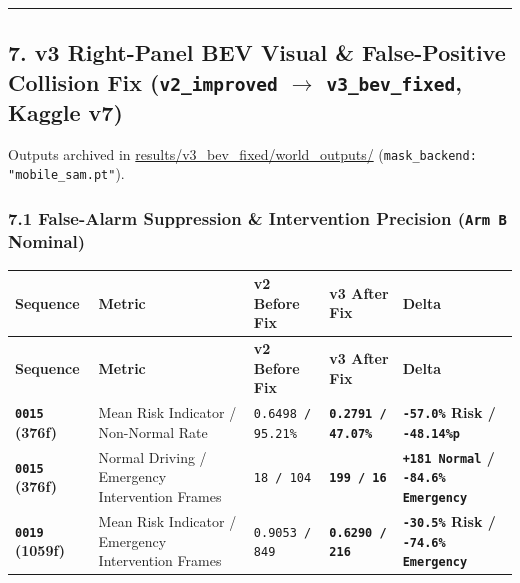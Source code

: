 \documentclass[10.5pt,a4paper]{article}
\begin{document}
\par\noindent\rule{\textwidth}{0.4pt}\par\medskip

\subsection{7. v3 Right-Panel BEV Visual \& False-Positive Collision Fix (\texttt{v2\_\allowbreak{}improved} $\rightarrow$ \texttt{v3\_\allowbreak{}bev\_\allowbreak{}fixed}, Kaggle v7)}

Outputs archived in \href{https://github.com/Heisnotanimposter/Totalcare\_autonomous\_driving\_Yolov5/tree/main/results/v3\_bev\_fixed/world\_outputs}{results/v3\_bev\_fixed/world\_outputs/} (\texttt{mask\_\allowbreak{}backend:\allowbreak{} "mobile\_\allowbreak{}sam.\allowbreak{}pt"}).


\subsubsection{7.1 False-Alarm Suppression \& Intervention Precision (\texttt{Arm B} Nominal)}

\begin{footnotesize}
\setlength{\tabcolsep}{4pt}
\setlength{\LTleft}{0pt}\setlength{\LTright}{0pt}
\begin{longtable}{>{\raggedright\arraybackslash}p{} >{\raggedright\arraybackslash}p{} >{\raggedright\arraybackslash}p{} >{\raggedright\arraybackslash}p{} >{\raggedright\arraybackslash}p{}}
\toprule
\textbf{Sequence} & \textbf{Metric} & \textbf{v2 Before Fix} & \textbf{v3 After Fix} & \textbf{Delta} \\
\midrule
\endfirsthead
\toprule
\textbf{Sequence} & \textbf{Metric} & \textbf{v2 Before Fix} & \textbf{v3 After Fix} & \textbf{Delta} \\
\midrule
\endhead
\bottomrule
\endfoot
\textbf{\texttt{0015} (376f)} & Mean Risk Indicator / Non-Normal Rate & \texttt{0.\allowbreak{}6498 /\allowbreak{} 95.\allowbreak{}21\%} & \textbf{\texttt{0.\allowbreak{}2791 /\allowbreak{} 47.\allowbreak{}07\%}} & \textbf{\texttt{-\allowbreak{}57.\allowbreak{}0\%} Risk / \texttt{-\allowbreak{}48.\allowbreak{}14\%p}} \\
\textbf{\texttt{0015} (376f)} & Normal Driving / Emergency Intervention Frames & \texttt{18 /\allowbreak{} 104} & \textbf{\texttt{199 /\allowbreak{} 16}} & \textbf{\texttt{+181 Normal} / \texttt{-\allowbreak{}84.\allowbreak{}6\% Emergency}} \\
\textbf{\texttt{0019} (1059f)} & Mean Risk Indicator / Emergency Intervention Frames & \texttt{0.\allowbreak{}9053 /\allowbreak{} 849} & \textbf{\texttt{0.\allowbreak{}6290 /\allowbreak{} 216}} & \textbf{\texttt{-\allowbreak{}30.\allowbreak{}5\%} Risk / \texttt{-\allowbreak{}74.\allowbreak{}6\% Emergency}} \\
\end{longtable}
\end{footnotesize}
\end{document}
